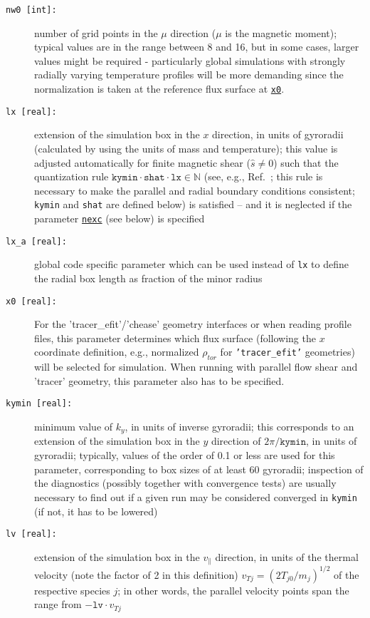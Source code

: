 \documentclass[12pt]{article}
\begin{document}
\begin{description}
\item[\hypertarget{nw0}{\tt nw0 [int]:}] number of grid points in the $\mu$ direction ($\mu$ is the magnetic moment);
typical values are in the range between 8 and 16, but in some cases, larger values might be required -
particularly global simulations with strongly radially varying temperature profiles will
be more demanding since the normalization is taken at the reference flux surface at \hyperlink{x0}{\tt x0}.
\item[\texttt{lx [real]:}] extension of the simulation box in the $x$ direction, in units of gyroradii
(calculated by using the units of mass and temperature); this value is adjusted automatically for
finite magnetic shear ($\hat s\ne 0$) such that the quantization rule
$\texttt{kymin}\cdot\texttt{shat}\cdot\texttt{lx}\in\mathbb{N}$ (see, e.g., Ref.~\cite{beer}; this rule is
necessary to make the parallel and radial boundary conditions consistent; \texttt{kymin} and \texttt{shat}
are defined below) is satisfied -- and it is neglected if the parameter \hyperlink{nexc}{\texttt{nexc}} (see below) is specified
\item[\texttt{lx\_a [real]:}] global code specific parameter which can be used instead of {\tt lx} to define
the radial box length as fraction of the minor radius
\item[\hypertarget{x0}{\tt x0 [real]:}] For the 'tracer\_efit'/'chease' geometry interfaces or when reading profile files,
this parameter determines which flux surface (following the $x$ coordinate definition, e.g., normalized $\rho_{tor}$ for {\tt 'tracer\_efit'} geometries) will be selected for simulation. When
running with parallel flow shear and 'tracer' geometry, this parameter also has to be specified.
\item[\texttt{kymin [real]:}] minimum value of $k_y$, in units of inverse gyroradii; this corresponds to
an extension of the simulation box in the $y$ direction of $2\pi/\texttt{kymin}$, in units of gyroradii;
typically, values of the order of 0.1 or less are used for this parameter, corresponding to box sizes of
at least 60 gyroradii; inspection of the \gene diagnostics (possibly together with convergence tests) are
usually necessary to find out if a given run may be considered converged in \texttt{kymin} (if not, it
has to be lowered)
\item[\texttt{lv [real]:}] extension of the simulation box in the $v_\|$ direction, in units of the
thermal velocity (note the factor of 2 in this definition) $v_{Tj}=(2T_{j0}/m_j)^{1/2}$ of the respective
species $j$; in other words, the parallel velocity points span the range from $- \mathtt{lv} \cdot v_{Tj}$

\end{description}
\end{document}
